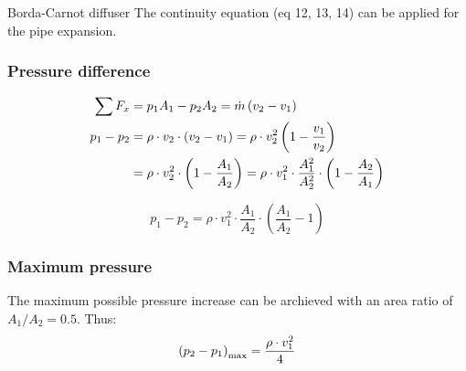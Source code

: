 \documentclass{article}
\begin{document}
\begin{multicols}{2}
\begin{examplebox}{Borda-Carnot diffuser}
    The continuity equation (eq 12, 13, 14) can be applied for the pipe expansion.

    \subsubsection{Pressure difference}
    \vspace*{-0.3cm}
    \begin{align}
        \sum F_x &= p_1A_1 - p_2A_2 = \dot{m}\left(v_2-v_1\right) \\
        p_1 - p_2 &= \rho \cdot v_2 \cdot \left(v_2 - v_1\right) = \rho \cdot v_2^2 \left(1-\frac{v_1}{v_2}\right) \notag \\
        &= \rho \cdot v_2^2\cdot\left(1-\frac{A_1}{A_2}\right) = \rho\cdot v_1^2 \cdot \frac{A_1^2}{A_2^2}\cdot \left(1-\frac{A_2}{A_1}\right)\notag
    \end{align}

    \begin{equation}
        p_1 - p_2 = \rho \cdot v_1^2\cdot \frac{A_1}{A_2}\cdot \left(\frac{A_1}{A_2}-1\right)
    \end{equation}

    \subsubsection{Maximum pressure}
    The maximum possible pressure increase can be archieved with an
    area ratio of $A_1 / A_2 = 0.5$. Thus:
    \begin{equation} 
        \left(p_2 - p_1\right)_{\rm max} = \frac{\rho\cdot v_1^2}{4}
    \end{equation}
\end{examplebox}
\vfill
\end{multicols}
\end{document}
